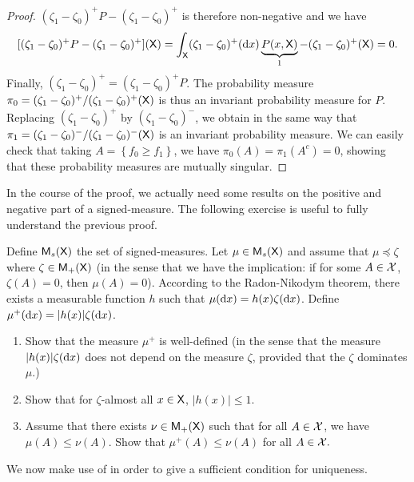 \documentclass[english,graybox,envcountchap,envcountsame,sectrefs,shortlabels]{svmono}
\theoremstyle{style}
\begin{document}
\begin{proof}
$(\zeta_{1}-\zeta_{0})^{+}P-(\zeta_{1}-\zeta_{0})^{+}$ is therefore
non-negative and we have
\[
[(\zeta_{1}-\zeta_{0})^{+}P-(\zeta_{1}-\zeta_{0})^{+}](\mathsf{X})=\int_{\mathsf{X}}(\zeta_{1}-\zeta_{0})^{+}(\mathrm{d} x)\underbrace{P(x,\mathsf{X})}_{1}-(\zeta_{1}-\zeta_{0})^{+}(\mathsf{X})=0.
\]
Finally, $(\zeta_{1}-\zeta_{0})^{+}=(\zeta_{1}-\zeta_{0})^{+}P$.
The probability measure $\pi_{0}=(\zeta_{1}-\zeta_{0})^{+}/(\zeta_{1}-\zeta_{0})^{+}(\mathsf{X})$
is thus an invariant probability measure for $P$. Replacing $(\zeta_{1}-\zeta_{0})^{+}$
by $(\zeta_{1}-\zeta_{0})^{-}$, we obtain in the same way that $\pi_{1}=(\zeta_{1}-\zeta_{0})^{-}/(\zeta_{1}-\zeta_{0})^{-}(\mathsf{X})$
is an invariant probability measure. We can easily check that taking
$A=\left\{ f_{0}\geq f_{1}\right\} $, we have $\pi_{0}(A)=\pi_{1}(A^{c})=0$,
showing that these probability measures are mutually singular.
\end{proof}
In the course of the proof, we actually need some
results on the positive and negative part of a signed-measure. The following exercise is useful to fully understand the previous proof. 
\begin{exercise}
Define $\mathsf{M}_{s}(\mathsf{X})$ the set of signed-measures. Let $\mu\in\mathsf{M}_{s}(\mathsf{X})$
and assume that $\mu\preceq\zeta$ where $\zeta\in\mathsf{M}_{+}(\mathsf{X})$
(in the sense that we have the implication: if for some $A\in\mathcal{X}$,
$\zeta(A)=0$, then $\mu(A)=0$). According to the Radon-Nikodym theorem,
there exists a measurable function $h$ such that $\mu(\mathrm{d} x)=h(x)\zeta(\mathrm{d} x)$.
Define $\mu^{+}(\mathrm{d} x)=|h(x)|\zeta(\mathrm{d} x)$.
\begin{enumerate}
\item Show that the measure $\mu^{+}$ is well-defined (in the sense that
the measure $|h(x)|\zeta(\mathrm{d} x)$ does not depend on the measure
$\zeta$, provided that the $\zeta$ dominates $\mu$.)
\item Show that for $\zeta$-almost all $x\in\mathsf{X}$, $|h(x)|\leq1$.
\item Assume that there exists $\nu\in\mathsf{M}_{+}(\mathsf{X})$ such that for all
$A\in\mathcal{X}$, we have $\mu(A)\leq\nu(A)$. Show that $\mu^{+}(A)\leq\nu(A)$
for all $A\in\mathcal{X}.$
\end{enumerate}
\end{exercise}
We now make use of  in order to
give a sufficient condition for uniqueness.
\end{document}
